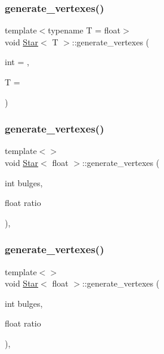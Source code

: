 \subsubsection{\texorpdfstring{generate\+\_\+vertexes()}{generate\_vertexes()}\hspace{0.1cm}{\footnotesize\ttfamily [2/6]}}
{\footnotesize\ttfamily template$<$typename T  = float$>$ \\
void \mbox{\hyperlink{classStar}{Star}}$<$ T $>$\+::generate\+\_\+vertexes (\begin{DoxyParamCaption}\item[{int}]{ = {},  }\item[{T}]{ = {} }\end{DoxyParamCaption})\hspace{0.3cm}{\ttfamily [private]}}

\mbox{\label{classStar_ab46cbc7aca971bc1c07b8d4afe8fba37}} 
\subsubsection{\texorpdfstring{generate\+\_\+vertexes()}{generate\_vertexes()}\hspace{0.1cm}{\footnotesize\ttfamily [3/6]}}
{\footnotesize\ttfamily template$<$$>$ \\
void \mbox{\hyperlink{classStar}{Star}}$<$ float $>$\+::generate\+\_\+vertexes (\begin{DoxyParamCaption}\item[{int}]{bulges,  }\item[{float}]{ratio }\end{DoxyParamCaption})\hspace{0.3cm}{\ttfamily [inline]}, {\ttfamily [private]}}

\mbox{\label{classStar_ab46cbc7aca971bc1c07b8d4afe8fba37}} 
\subsubsection{\texorpdfstring{generate\+\_\+vertexes()}{generate\_vertexes()}\hspace{0.1cm}{\footnotesize\ttfamily [4/6]}}
{\footnotesize\ttfamily template$<$$>$ \\
void \mbox{\hyperlink{classStar}{Star}}$<$ float $>$\+::generate\+\_\+vertexes (\begin{DoxyParamCaption}\item[{int}]{bulges,  }\item[{float}]{ratio }\end{DoxyParamCaption})\hspace{0.3cm}{\ttfamily [inline]}, {\ttfamily [private]}}

